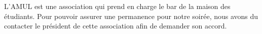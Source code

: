 L'AMUL est une association qui prend en charge le bar de la maison des étudiants.
Pour pouvoir assurer une permanence pour notre soirée, nous avons du contacter le président de cette association afin de demander son accord.
